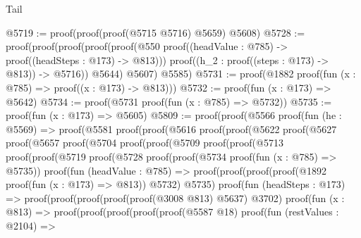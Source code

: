 \begin{lexlean}{Tail}
\begin{coremodule}
@5719 := proof(proof(proof(@5715 @5716) @5659) @5608)
@5728 := proof(proof(proof(proof(proof(@550
              proof((headValue : @785) -> proof((headSteps : @173) -> @813)))
            proof((h_2 : proof((steps : @173) -> @813)) -> @5716))
          @5644)
        @5607)
      @5585)
@5731 := proof(@1882 proof(fun (x : @785) => proof((x : @173) -> @813)))
@5732 := proof(fun (x : @173) => @5642)
@5734 := proof(@5731 proof(fun (x : @785) => @5732))
@5735 := proof(fun (x : @173) => @5605)
@5809 := proof(proof(@5566
        proof(fun (he : @5569) =>
          proof(@5581
              proof(proof(@5616
                    proof(proof(@5622
                          proof(@5627
                              proof(@5657
                                  proof(@5704
                                      proof(proof(@5709
                                            proof(proof(@5713
                                                  proof(proof(@5719
                                                        proof(@5728
                                                            proof(proof(@5734
                                                                  proof(fun (x : @785) => @5735))
                                                                proof(fun (headValue : @785) =>
                                                                  proof(proof(proof(proof(@1892
                                                                            proof(fun (x : @173) =>
                                                                              @813))
                                                                          @5732)
                                                                        @5735)
                                                                      proof(fun (headSteps : @173) =>
                                                                        proof(proof(proof(proof(proof(@3008
                                                                                    @813)
                                                                                  @5637)
                                                                                @3702)
                                                                              proof(fun (x : @813) =>
                                                                                proof(proof(proof(proof(proof(@5587
                                                                                            @18)
                                                                                          proof(fun (restValues : @2104) =>

\end{coremodule}
\end{lexlean}
